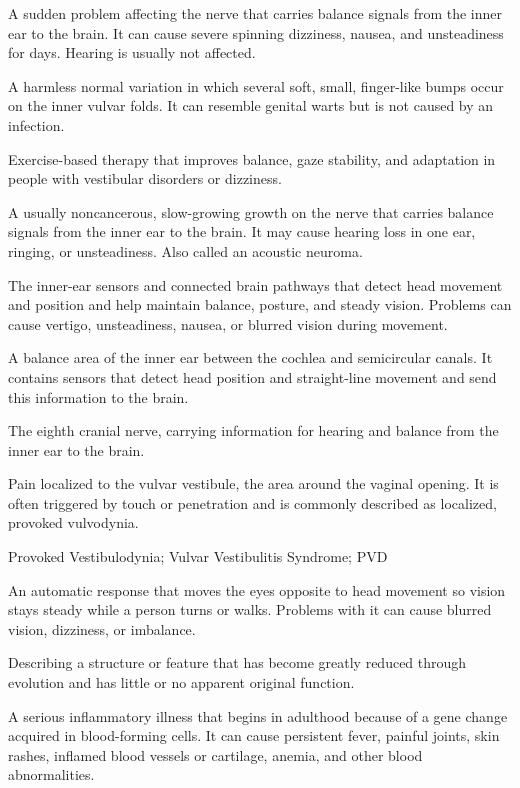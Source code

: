  A sudden problem affecting the nerve that carries balance signals from the inner ear to the brain. It can cause severe spinning dizziness, nausea, and unsteadiness for days. Hearing is usually not affected.

 A harmless normal variation in which several soft, small, finger-like bumps occur on the inner vulvar folds. It can resemble genital warts but is not caused by an infection.

 Exercise-based therapy that improves balance, gaze stability, and adaptation in people with
vestibular disorders or dizziness.

 A usually noncancerous, slow-growing growth on the nerve that carries balance signals from the inner ear to the brain. It may cause hearing loss in one ear, ringing, or unsteadiness. Also called an acoustic neuroma.

 The inner-ear sensors and connected brain pathways that detect head movement and position and help maintain balance, posture, and steady vision. Problems can cause vertigo, unsteadiness, nausea, or blurred vision during movement.

 A balance area of the inner ear between the cochlea and semicircular canals. It contains sensors that detect head position and straight-line movement and send this information to the brain.

 The eighth cranial nerve, carrying information for hearing and balance from the inner ear to the brain.

 Pain localized to the vulvar vestibule, the area around the vaginal opening. It is often triggered by touch or penetration and is commonly described as localized, provoked vulvodynia.

\synonyms
Provoked Vestibulodynia; Vulvar Vestibulitis Syndrome; PVD

 An automatic response that moves the eyes opposite to head movement so vision stays steady while a person turns or walks. Problems with it can cause blurred vision, dizziness, or imbalance.

 Describing a structure or feature that has become greatly reduced through evolution and has little or no apparent original function.

 A serious inflammatory illness that begins in adulthood because of a gene change acquired in blood-forming cells. It can cause persistent fever, painful joints, skin rashes, inflamed blood vessels or cartilage, anemia, and other blood abnormalities.

